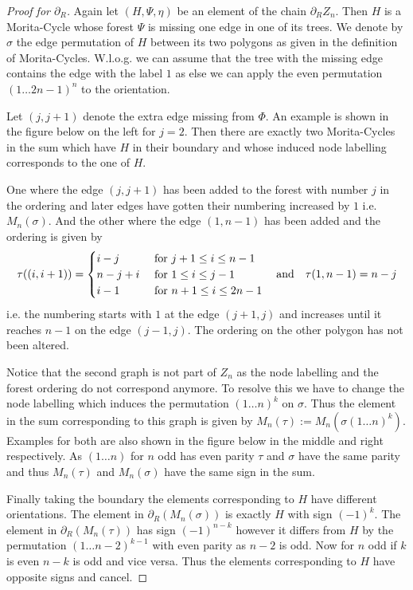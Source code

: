 \begin{proof}[Proof for $\partial_{R}$]
	Again let $(H,\Psi,\eta)$ be an element of the chain $\partial_{R} Z_{n}$.
	Then $H$ is a Morita-Cycle whose forest $\Psi$ is missing one edge in one of its trees.
	We denote by $\sigma$ the edge permutation of $H$ between its two polygons as given in the definition of Morita-Cycles.
	W.l.o.g. we can assume that the tree with the missing edge contains the 
	edge with the label $1$ as else we can apply the even permutation $(1 \ldots 2n-1)^{n}$ to the orientation.
	
	Let $(j,j+1)$ denote the extra edge missing from  $\Phi$. An example is shown in the figure below on the left for $j = 2$.
	Then there are exactly two Morita-Cycles in the sum which have $H$ in their boundary and whose induced node labelling corresponds to the one of $H$.

	One where the edge $(j,j+1)$ has been added to the forest with number $j$ in the ordering and later edges have gotten their numbering increased by $1$
	i.e. $M_{n}(\sigma)$.
	And the other where the edge $(1,n-1)$ has been added and the ordering is given by
	\[
		\tau((i,i+1)) = \begin{cases}
			i-j & \text{ for } j+1 \leq i \leq n-1\\
			n-j+i & \text{ for } 1 \leq i \leq j-1\\
			i-1 & \text{ for } n+1 \leq i \leq 2n-1
		\end{cases} \qq{and} \tau(1,n-1) = n-j
	\] i.e. the numbering starts with $1$ at the edge $(j+1,j)$ and increases until it reaches $n-1$ on the edge  $(j-1,j)$. 
	The ordering on the other polygon has not been altered.
	
	Notice that the second graph is not part of $Z_{n}$ as the node labelling and the forest ordering do not correspond anymore. 
	To resolve this we have to change the node labelling which induces the permutation $(1 \ldots n)^{k}$ on $\sigma$.
	Thus the element in the sum corresponding to this graph is given by  $M_{n}(\tau) := M_{n}(\sigma (1 \ldots n)^{k})$.
	Examples for both are also shown in the figure below in the middle and right respectively.
	As $(1 \ldots n)$ for $n$ odd has even parity $\tau$ and $\sigma$ have the same parity and thus $M_{n}(\tau)$ and $M_{n}(\sigma)$ have the same sign
	in the sum. 
	
	Finally taking the boundary the elements corresponding to $H$ have different orientations.
	The element in $\partial_{R}(M_{n}(\sigma))$ is exactly $H$ with sign $(-1)^{k}$. The element in $\partial_{R}(M_{n}(\tau))$ has sign $(-1)^{n-k}$ however it 
	differs from $H$ by the permutation $(1 \ldots n-2)^{k - 1}$ with even parity as $n-2$ is odd.
	Now for $n$ odd if $k$ is even $n-k$ is odd and vice versa. Thus the elements corresponding to $H$ have opposite signs and cancel.


\end{proof}
